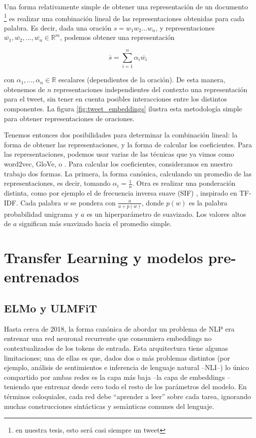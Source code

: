 Una forma relativamente simple de obtener una representación de un documento \footnote{en nuestra tesis, esto será casi siempre un tweet} es realizar una combinación lineal de las representaciones obtenidas para cada palabra. Es decir, dada una oración $s = w_1 w_2 \ldots w_n$, y representaciones $\overline{w_1}, \overline{w_2}, \ldots, \overline{w_n} \in \mathbb{R}^m$, podemos obtener una representación

\begin{equation}
    \overline{s} = \sum\limits_{i=1}^{n} \alpha_i \overline{w_i}
\end{equation}

con $\alpha_1, \ldots, \alpha_n \in \mathbb{R}$ escalares (dependientes de la oración). De esta manera, obtenemos de $n$ representaciones independientes del contexto una representación para el tweet, sin tener en cuenta posibles interacciones entre los distintos componentes. La figura \ref{fig:tweet_embeddings} ilustra esta metodología simple para obtener representaciones de oraciones.

Tenemos entonces dos posibilidades para determinar la combinación lineal: la forma de obtener las representaciones, y la forma de calcular los coeficientes. Para las representaciones, podemos usar varias de las técnicas que ya vimos como word2vec, GloVe, o \fasttext{}. Para calcular los coeficientes, consideramos en nuestro trabajo dos formas. La primera, la forma canónica, calculando un promedio de las representaciones, es decir, tomando $\alpha_i = \frac{1}{n}$. Otra es realizar una ponderación distinta, como por ejemplo el de frecuencia inversa suave (SIF) \cite{arora17}, inspirado en TF-IDF. Cada palabra $ w $ se pondera con $ \frac {a} {a + p (w)} $, donde $ p (w) $ es la palabra probabilidad unigrama y $ a $ es un hiperparámetro de suavizado. Los valores altos de $ a $ significan más suavizado hacia el promedio simple.



\section{Transfer Learning y modelos pre-entrenados}

\subsection{ELMo y ULMFiT}
\label{subsec:elmo}

Hasta cerca de 2018, la forma canónica de abordar un problema de NLP era entrenar una red neuronal recurrente que consumiera embeddings no contextualizados de los tokens de entrada. Esta arquitectura tiene algunas limitaciones; una de ellas es que, dados dos o más problemas distintos (por ejemplo, análisis de sentimientos e inferencia de lenguaje natural --NLI--) lo único compartido por ambas redes es la capa más baja --la capa de embeddings -- teniendo que entrenar desde cero todo el resto de los parámetros del modelo. En términos coloquiales, cada red debe ``aprender a leer'' sobre cada tarea, ignorando muchas construcciones sintácticas y semánticas comunes del lenguaje.


